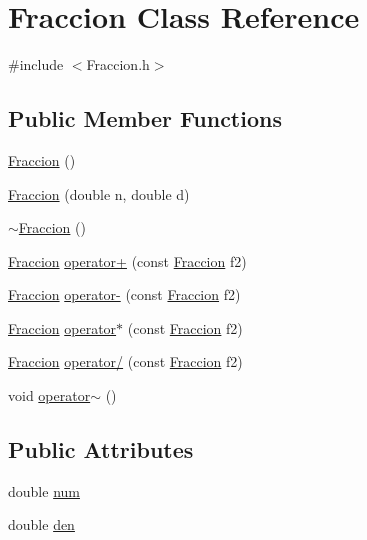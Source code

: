 \hypertarget{class_fraccion}{\section{Fraccion Class Reference}
\label{class_fraccion}
}


{\ttfamily \#include $<$Fraccion.\+h$>$}

\subsection*{Public Member Functions}
\begin{DoxyCompactItemize}
\item 
\hyperlink{class_fraccion_a80b8bb475192ceb820428a57e911ceb5}{Fraccion} ()
\item 
\hyperlink{class_fraccion_a3e1003b9ae321c94a95081f5346ab8b8}{Fraccion} (double n, double d)
\item 
\hyperlink{class_fraccion_abb2ec579092e5bc50e7c3644ea718084}{$\sim$\+Fraccion} ()
\item 
\hyperlink{class_fraccion}{Fraccion} \hyperlink{class_fraccion_ad9e6571b18acafd30480d2edacc5ecf5}{operator+} (const \hyperlink{class_fraccion}{Fraccion} f2)
\item 
\hyperlink{class_fraccion}{Fraccion} \hyperlink{class_fraccion_aa200891863fbeb110bf28e23d639e468}{operator-\/} (const \hyperlink{class_fraccion}{Fraccion} f2)
\item 
\hyperlink{class_fraccion}{Fraccion} \hyperlink{class_fraccion_a0857d8edad85059f5976b4b962ae800c}{operator$\ast$} (const \hyperlink{class_fraccion}{Fraccion} f2)
\item 
\hyperlink{class_fraccion}{Fraccion} \hyperlink{class_fraccion_abc2f6f83bee7cea70a689cdbf9bbd840}{operator/} (const \hyperlink{class_fraccion}{Fraccion} f2)
\item 
void \hyperlink{class_fraccion_a6ba2dac78e5ef60d6860d39ba3489bb1}{operator$\sim$} ()
\end{DoxyCompactItemize}
\subsection*{Public Attributes}
\begin{DoxyCompactItemize}
\item 
double \hyperlink{class_fraccion_a1c4a5b2bc4a188ba06efbc84a21d72e9}{num}
\item 
double \hyperlink{class_fraccion_a7bb085aa596736964bf6444c974a2913}{den}
\end{DoxyCompactItemize}


